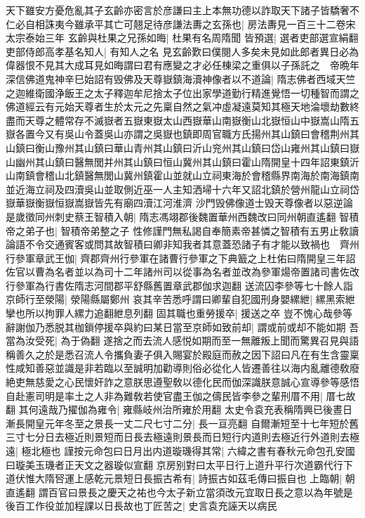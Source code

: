 天下雖安方憂危亂其子玄齡亦密言於彦謙曰主上本無功德以詐取天下諸子皆驕奢不仁必自相誅夷今雖承平其亡可翹足待彦謙法夀之玄孫也|{
	房法夀見一百三十二卷宋太宗泰始三年}
玄齡與杜果之兄孫如晦|{
	杜果有名周隋聞}
皆預選|{
	選者吏部選宣絹翻}
吏部侍郎高孝基名知人|{
	有知人之名}
見玄齡歎曰僕閱人多矣未見如此郎者異日必為偉器恨不見其大成耳見如晦謂曰君有應變之才必任棟梁之重俱以子孫託之　帝晩年深信佛道鬼神辛巳始詔有毁佛及天尊嶽鎮海瀆神像者以不道論|{
	隋志佛者西域天竺之迦維衛國浄飯王之太子釋迦牟尼捨太子位出家學道勤行精進覺悟一切種智而謂之佛道經云有元始天尊者生於太元之先稟自然之氣冲虛凝遠莫知其極天地淪壞劫數終盡而天尊之體常存不滅嶽者五嶽東嶽太山西嶽華山南嶽衡山北嶽恒山中嶽嵩山隋五嶽各置今又有吳山令蓋吳山亦謂之吳嶽也鎮即周官職方氏揚州其山鎮曰會稽荆州其山鎮曰衡山豫州其山鎮曰華山青州其山鎮曰沂山兖州其山鎮曰岱山雍州其山鎮曰嶽山幽州其山鎮曰醫無閭并州其山鎮曰恒山冀州其山鎮曰霍山隋開皇十四年詔東鎮沂山南鎮會稽山北鎮醫無閭山冀州鎮霍山並就山立祠東海於會稽縣界南海於南海鎮南並近海立祠及四瀆吳山並取側近巫一人主知洒埽十六年又詔北鎮於營州龍山立祠岱嶽華嶽衡嶽恒嶽嵩嶽皆先有廟四瀆江河淮濟}
沙門毁佛像道士毁天尊像者以惡逆論　是歲徵同州刺史蔡王智積入朝|{
	隋志馮翊郡後魏置華州西魏改曰同州朝直遙翻}
智積帝之弟子也|{
	智積帝弟整之子}
性修謹門無私謁自奉簡素帝甚憐之智積有五男止敎讀論語不令交通賓客或問其故智積曰卿非知我者其意蓋恐諸子有才能以致禍也　齊州行參軍章武王伽|{
	齊郡齊州行參軍在諸曹行參軍之下典籖之上杜佑曰隋開皇三年詔佐官以曹為名者並以為司十二年諸州司以從事為名者並改為參軍煬帝置諸司書佐改行參軍為行書佐隋志河間郡平舒縣舊置章武郡伽求迦翻}
送流囚李參等七十餘人詣京師行至滎陽|{
	滎陽縣屬鄭州}
哀其辛苦悉呼謂曰卿輩自犯國刑身嬰縲紲|{
	縲黑索紲攣也所以拘罪人縲力追翻紲息列翻}
固其職也重勞援卒|{
	援送之卒}
豈不愧心哉參等辭謝伽乃悉脱其枷鎖停援卒與約曰某日當至京師如致前却|{
	謂或前或却不能如期}
吾當為汝受死|{
	為于偽翻}
遂捨之而去流人感悦如期而至一無離叛上聞而驚異召見與語稱善久之於是悉召流人令攜負妻子俱入賜宴於殿庭而赦之因下詔曰凡在有生含靈稟性咸知善惡並識是非若臨以至誠明加勸導則俗必從化人皆遷善往以海内亂離德敎廢絶吏無慈愛之心民懷奸詐之意朕思遵聖敎以德化民而伽深識朕意誠心宣導參等感悟自赴憲司明是率土之人非為難敎若使官盡王伽之儔民皆李參之輩刑厝不用|{
	厝七故翻}
其何遠哉乃擢伽為雍令|{
	雍縣岐州治所雍於用翻}
太史令袁充表稱隋興已後晝日漸長開皇元年冬至之景長一丈二尺七寸二分|{
	長一亘亮翻}
自爾漸短至十七年短於舊三寸七分日去極近則景短而日長去極遠則景長而日短行内道則去極近行外道則去極遠|{
	極北極也}
謹按元命包曰日月出内道璇璣得其常|{
	六緯之書有春秋元命包孔安國曰璇美玉璣者正天文之器璇似宣翻}
京房别對曰太平日行上道升平行次道霸代行下道伏惟大隋唘運上感乾元景短日長振古希有|{
	詩振古如茲毛傳曰振自也}
上臨朝|{
	朝直遙翻}
謂百官曰景長之慶天之祐也今太子新立當須改元宜取日長之意以為年號是後百工作役並加程課以日長故也丁匠苦之|{
	史言袁充誣天以病民}
